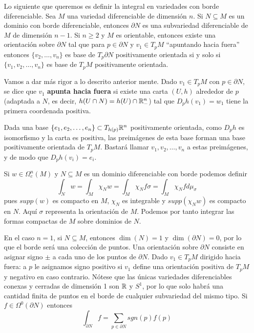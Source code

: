 \documentclass[CV.tex]{subfiles}
\begin{document}
Lo siguiente que queremos es definir la integral en variedades con borde diferenciable. Sea $M$ una variedad diferenciable de dimensión $n$. Si $N\subseteq M$ es un dominio con borde diferenciable, entonces $\partial N$ es una subvariedad diferenciable de $M$ de dimensión $n-1$. Si $n\geq 2$ y $M$ es orientable, entonces existe una orientación sobre $\partial N$ tal que para $p\in\partial N$ y $v_1\in T_pM$ ``apuntando hacia fuera'' entonces $\{v_2,\dots, v_n\}$ es base de $T_p\partial N$ positivamente orientada si y solo si $\{v_1,v_2,\dots, v_n\}$ es base de $T_pM$ positivamente orientada. 

Vamos a dar más rigor a lo descrito anterior mente. Dado $v_1\in T_pM$ con $p\in\partial N$, se dice que $v_1$ \textbf{apunta hacia fuera} si existe una carta $(U,h)$ alrededor de $p$ (adaptada a $N$, es decir, $h(U\cap N)=h(U)\cap \mathbb{R}^n_-$) tal que $D_ph(v_1)=w_1$ tiene la primera coordenada positiva. 

Dada una base $\{e_1,e_2,\dots, e_n\}\subset T_{h(p)}\mathbb{R}^n$ positivamente orientada, como $D_ph$ es isomorfismo y la carta es positiva, las preimágenes de esta base forman una base positivamente orientada de $T_pM$. Bastará llamar $v_1,v_2,\dots, v_n$ a estas preimágenes, y de modo que $D_ph(v_i)=e_i$. 

\begin{nota}
Si $w\in\Omega_c^n(M)$ y $N\subseteq M$ es un dominio diferenciable con borde podemos definir
\[
\int_N w=\int_M\chi_N w=\int_M \chi_N f\sigma=\int_M \chi_N f d\mu_{\sigma}
\]
pues $supp(w)$ es compacto en $M$, $\chi_N$ es integrable y $supp(\chi_Nw)$ es compacto en $N$. Aquí $\sigma$ representa la orientación de $M$. Podemos por tanto integrar las formas compactas de $M$ sobre dominios de $N$.

En el caso $n=1$, si $N\subseteq M$, entonces $\dim(N)=1$ y $\dim(\partial N)=0$, por lo que el borde será una colección de puntos. Una orientación sobre $\partial N$ consiste en asignar signo $\pm$ a cada uno de los puntos de $\partial N$. Dado $v_1\in T_pM$ dirigido hacia fuera: a $p$ le asignamos signo positivo si $v_1$ define una orientación positiva de $T_pM$ y negativo en caso contrario. Nótese que las únicas variedades diferenciables conexas y cerradas de dimensión 1 son $\mathbb{R}$ y $S^1$, por lo que solo habrá una cantidad finita de puntos en el borde de cualquier subvariedad del mismo tipo. Si $f\in\Omega^0(\partial N)$ entonces 
\[
\int_{\partial N} f=\sum_{p\in\partial N} sgn(p)f(p)
\]
\end{nota}
\end{document}
